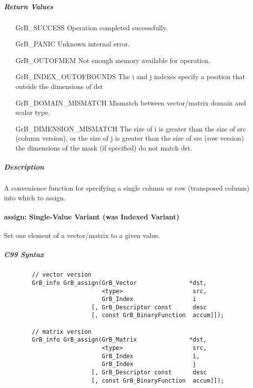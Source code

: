 \subparagraph{Return Values}

\begin{itemize}[leftmargin=2.1in]
\item[{\sf GrB\_SUCCESS}]             Operation completed successfully.
\item[{\sf GrB\_PANIC}]               Unknown internal error.
\item[{\sf GrB\_OUTOFMEM}]            Not enough memory available for operation.
\item[{\sf GrB\_INDEX\_OUTOFBOUNDS}]  The i and j indexes specify a position that outside the dimensions of dst
\item[{\sf GrB\_DOMAIN\_MISMATCH}]    Mismatch between vector/matrix domain and scalar type.
\item[{\sf GrB\_DIMENSION\_MISMATCH}] 
        The size of {\sf i} is greater than the size of {\sf src} (column version), or
        the size of {\sf j} is greater than the size of {\sf src} (row version)
        the dimensions of the mask (if specified) do not match {\sf dst}.
\end{itemize}

\subparagraph{Description}

A convenience function for specifying a single column or row (transposed column) into which to assign.

\paragraph{{\sf assign}: Single-Value Variant (was Indexed Variant)}

Set one element of a vector/matrix to a given value.

\subparagraph{C99 Syntax}

\begin{verbatim}
        // vector version
        GrB_info GrB_assign(GrB_Vector               *dst,
                            <type>                    src,
                            GrB_Index                 i
                         [, GrB_Descriptor const      desc 
                         [, const GrB_BinaryFunction  accum]]);

        // matrix version
        GrB_info GrB_assign(GrB_Matrix               *dst,
                            <type>                    src,
                            GrB_Index                 i,
                            GrB_Index                 j
                         [, GrB_Descriptor const      desc 
                         [, const GrB_BinaryFunction  accum]]);
\end{verbatim}

